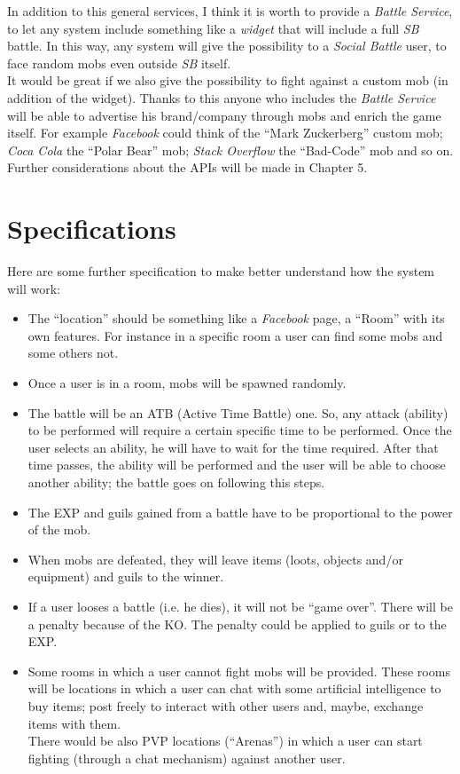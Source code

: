 		In addition to this general services, I think it is worth to provide a \textit{Battle Service}, to let any system 
		include something like a \textit{widget} that will include a full \textit{SB} battle. In this way, any system will give the possibility to a \textit{Social Battle} user, to face random mobs even outside \textit{SB} itself.\\
		It would be great if we also give the possibility to fight against a custom mob (in addition of the widget). Thanks to this anyone who includes the \textit{Battle Service} will be able to advertise his brand/company through mobs and enrich the game itself. For example \textit{Facebook} could think of the ``Mark Zuckerberg'' custom mob; \textit{Coca Cola} the ``Polar Bear'' mob; \textit{Stack Overflow} the ``Bad-Code'' mob and so on.\\

		Further considerations about the APIs will be made in Chapter 5.
	\section{Specifications}
		Here are some further specification to make better understand how the system will work:
		\begin{itemize}
			\item The ``location'' should be something like a \textit{Facebook} page, a ``Room'' with its own features. For instance in a specific room a user can find some mobs and some others not.
			\item Once a user is in a room, mobs will be spawned randomly.
			\item The battle will be an ATB (Active Time Battle) one. So, any attack (ability) to be performed will require a certain specific time to be performed. Once the user selects an ability, he will have to wait for the time required. After that time passes, the ability will be performed and the user will be able to choose another ability; the battle goes on following this steps.
			\item The EXP and guils gained from a battle have to be proportional to the power of the mob.
			\item When mobs are defeated, they will leave items (loots, objects and/or equipment) and guils to the winner.
			\item If a user looses a battle (i.e. he dies), it will not be ``game over''. There will be a penalty because of the KO. The penalty could be applied to guils or to the EXP.
			\item Some rooms in which a user cannot fight mobs will be provided. These rooms will be locations in which a user can chat with some artificial intelligence to buy items; post freely to interact with other users and, maybe, exchange items with them.\\
			There would be also PVP locations (``Arenas'') in which a user can start fighting (through a chat mechanism) against another user.
		\end{itemize}

